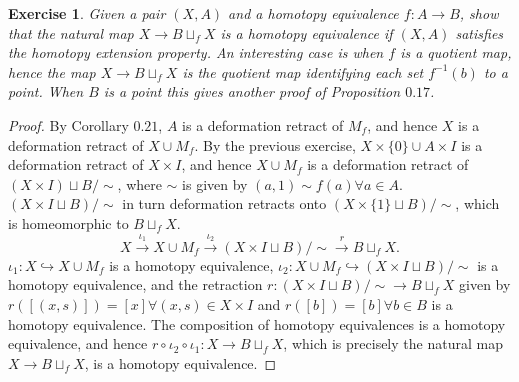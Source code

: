 \documentclass{article}
\newtheorem{exercise}{Exercise}[subsection]
\begin{document}
\begin{exercise}
Given a pair $(X,A)$ and a homotopy equivalence $f:A\to B$, show that the natural map $X\to B\sqcup_fX$ is a homotopy equivalence if $(X,A)$ satisfies the homotopy extension property. An interesting case is when $f$ is a quotient map, hence the map $X\to B\sqcup_f X$ is the quotient map identifying each set $f^{-1}(b)$ to a point. When $B$ is a point this gives another proof of Proposition $0.17$.
\end{exercise}
\begin{proof}
By Corollary $0.21$, $A$ is a deformation retract of $M_f$, and hence $X$ is a deformation retract of $X\cup M_f$. By the previous exercise, $X\times\{0\}\cup A\times I$ is a deformation retract of $X\times I$, and hence $X\cup M_f$ is a deformation retract of $(X\times I)\sqcup B/\sim$, where $\sim$ is given by $(a,1)\sim f(a)\forall a\in A$. $(X\times I\sqcup B)/\sim$ in turn deformation retracts onto $(X\times\{1\}\sqcup B)/\sim$, which is homeomorphic to $B\sqcup_fX$.\[X\overset{\iota_1}{\longrightarrow} X\cup M_f\overset{\iota_2}{\longrightarrow} (X\times I\sqcup B)/\sim\overset{r}{\longrightarrow} B\sqcup_fX.\] $\iota_1:X\hookrightarrow X\cup M_f$ is a homotopy equivalence, $\iota_2:X\cup M_f\hookrightarrow (X\times I\sqcup B)/\sim$ is a homotopy equivalence, and the retraction $r:(X\times I\sqcup B)/\sim\to B\sqcup _fX$ given by $r([(x,s)])=[x]\forall (x,s)\in X\times I$ and $r([b])=[b]\forall b\in B$ is a homotopy equivalence. The composition of homotopy equivalences is a homotopy equivalence, and hence $r\circ \iota_2\circ\iota_1:X\to B\sqcup_fX$, which is precisely the natural map $X\to B\sqcup_fX$, is a homotopy equivalence.
\end{proof}
\end{document}
